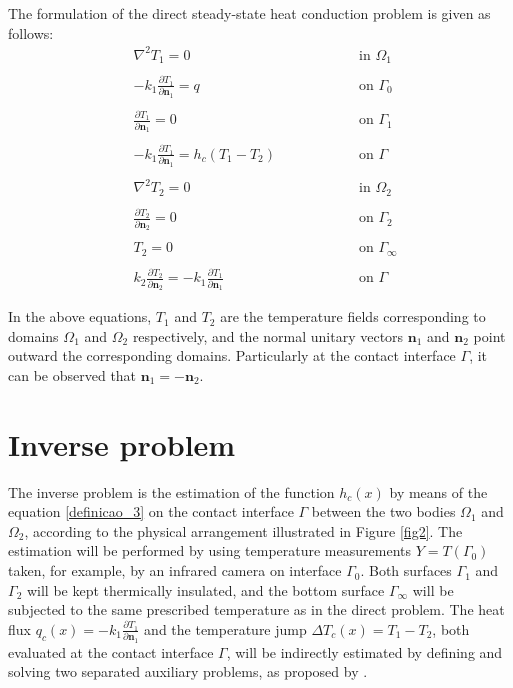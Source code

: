 \documentclass[12pt]{CHT-20}
\begin{document}
The formulation of the direct steady-state heat conduction problem is given as follows:
\begin{subequations}
	\begin{alignat}{2}
	& \nabla^2 T_1 = 0 \quad\quad\quad\quad && \text{ in } \Omega_1 \label{harm_T1} \\ \nonumber \\
	& -k_1 \frac{\partial T_1}{\partial\mathbf{n}_1} = q && \text{ on } \Gamma_0  \label{cc_T1_2} \\  \nonumber \\
	& \frac{\partial T_1}{\partial \mathbf{n}_1} = 0 && \text{ on }  \Gamma_1 \label{cc_T1_1} \\  \nonumber \\
	& -k_1 \frac{\partial T_1}{\partial\mathbf{n}_1} = h_c(T_1-T_2) \quad\quad\quad\quad && \text{ on }  \Gamma \label{cc_grad_T1} \\  \nonumber \\
	& \nabla^2 T_2 = 0 && \text{ in }  \Omega_2 \label{harm_T2} \\  \nonumber \\
	& \frac{\partial T_2}{\partial \mathbf{n}_2} = 0 && \text{ on }  \Gamma_2 \label{cc_T1_3} \\ \nonumber \\
	& T_2 = 0 && \text{ on }  \Gamma_\infty \label{cc_T1_4} \\  \nonumber \\
	& k_2\frac{\partial T_2}{\partial\mathbf{n}_2} = - k_1\frac{\partial T_1}{\partial\mathbf{n}_1} && \text{ on }  \Gamma \label{cc_T1_5}
	\end{alignat}
\end{subequations}

In the above equations, $T_1$ and $T_2$ are the temperature fields corresponding to domains $\Omega_1$ and $\Omega_2$ respectively, and the normal unitary vectors $\mathbf{n}_1$ and $\mathbf{n}_2$ point outward the corresponding domains. Particularly at the contact interface $\Gamma$, it can be observed that $\mathbf{n}_1 = -\mathbf{n}_2$.

\section*{Inverse problem}

The inverse problem is the estimation of the function $h_c(x)$ by means of the equation \eqref{definicao_3} on the contact interface $\Gamma$ between the two bodies $\Omega_1$ and $\Omega_2$, according to the physical arrangement illustrated in Figure \ref{fig2}. The estimation will be performed by using temperature measurements $Y = T(\Gamma_0)$ taken, for example, by an infrared camera on interface $\Gamma_0$. Both surfaces $\Gamma_1$ and $\Gamma_2$ will be kept thermically insulated, and the bottom surface $\Gamma_\infty$ will be subjected to the same prescribed temperature as in the direct problem. The heat flux $q_c(x) = -k_1\frac{\partial T_1}{\partial \mathbf{n}_1}$ and the temperature jump $\Delta T_c(x) = T_1 - T_2$, both evaluated at the contact interface $\Gamma$, will be indirectly estimated by defining and solving two separated auxiliary problems, as proposed by \cite{reciproc_3}.
\end{document}
